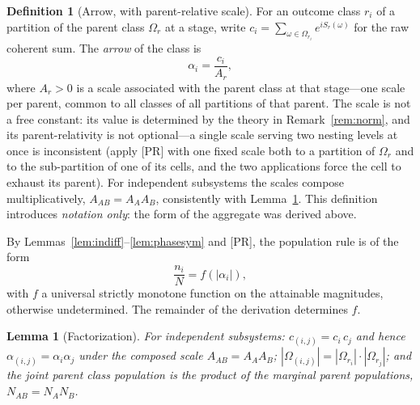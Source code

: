 \documentclass[11pt]{article}
\newtheorem{lemma}{Lemma}
\theoremstyle{definition}
\newtheorem{definition}{Definition}
\theoremstyle{remark}
\begin{document}
\begin{definition}[Arrow, with parent-relative scale]\label{def:arrow}
For an outcome class $r_i$ of a partition of the parent class $\Omega_r$ at a stage, write $c_i = \sum_{\omega \in \Omega_{r_i}} e^{iS_r(\omega)}$ for the raw coherent sum. The \emph{arrow} of the class is
\begin{equation}
\alpha_i = \frac{c_i}{A_r},
\end{equation}
where $A_r > 0$ is a scale associated with the parent class at that stage---one scale per parent, common to all classes of all partitions of that parent. The scale is not a free constant: its value is determined by the theory in Remark~\ref{rem:norm}, and its parent-relativity is not optional---a single scale serving two nesting levels at once is inconsistent (apply [PR] with one fixed scale both to a partition of $\Omega_r$ and to the sub-partition of one of its cells, and the two applications force the cell to exhaust its parent). For independent subsystems the scales compose multiplicatively, $A_{AB} = A_A A_B$, consistently with Lemma~\ref{lem:factor}. This definition introduces \emph{notation only}: the form of the aggregate was derived above.
\end{definition}

By Lemmas~\ref{lem:indiff}--\ref{lem:phasesym} and [PR], the population rule is of the form
\begin{equation}\label{eq:form}
\frac{n_i}{N} = f(|\alpha_i|),
\end{equation}
with $f$ a universal strictly monotone function on the attainable magnitudes, otherwise undetermined. The remainder of the derivation determines $f$.

\begin{lemma}[Factorization]\label{lem:factor}
For independent subsystems: $c_{(i,j)} = c_i\, c_j$ and hence $\alpha_{(i,j)} = \alpha_i \alpha_j$ under the composed scale $A_{AB} = A_A A_B$; $|\Omega_{(i,j)}| = |\Omega_{r_i}| \cdot |\Omega_{r_j}|$; and the joint parent class population is the product of the marginal parent populations, $N_{AB} = N_A N_B$.
\end{lemma}
\end{document}
